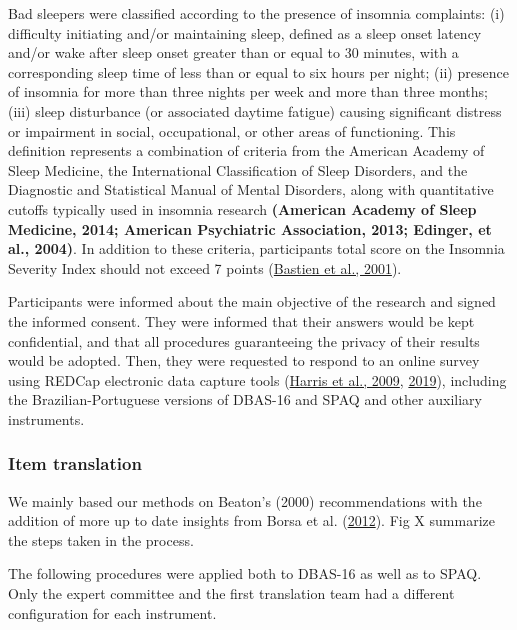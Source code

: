 \documentclass[
  ,doc,11pt, twoside,floatsintext]{apa6}
\begin{document}
Bad sleepers were classified according to the presence of insomnia complaints: (i) difficulty initiating and/or maintaining sleep, defined as a sleep onset latency and/or wake after sleep onset greater than or equal to 30 minutes, with a corresponding sleep time of less than or equal to six hours per night; (ii) presence of insomnia for more than three nights per week and more than three months; (iii) sleep disturbance (or associated daytime fatigue) causing significant distress or impairment in social, occupational, or other areas of functioning. This definition represents a combination of criteria from the American Academy of Sleep Medicine, the International Classification of Sleep Disorders, and the Diagnostic and Statistical Manual of Mental Disorders, along with quantitative cutoffs typically used in insomnia research \textbf{(American Academy of Sleep Medicine, 2014; American Psychiatric Association, 2013; Edinger, et al., 2004)}. In addition to these criteria, participants total score on the Insomnia Severity Index should not exceed 7 points (\protect\hyperlink{ref-bastien2001}{Bastien et al., 2001}).

Participants were informed about the main objective of the research and signed the informed consent. They were informed that their answers would be kept confidential, and that all procedures
guaranteeing the privacy of their results would be adopted. Then, they were requested to respond to an online survey using REDCap electronic data capture tools (\protect\hyperlink{ref-harris2009research}{Harris et al., 2009}, \protect\hyperlink{ref-harris2019redcap}{2019}), including the Brazilian-Portuguese versions of DBAS-16 and SPAQ and other auxiliary instruments.

\hypertarget{item-translation}{%
\subsubsection{Item translation}\label{item-translation}}

We mainly based our methods on Beaton's (2000) recommendations with the addition of more up to date insights from Borsa et al. (\protect\hyperlink{ref-borsaAdaptacaoValidacaoInstrumentos2012}{2012}). Fig X summarize the steps taken in the process.

The following procedures were applied both to DBAS-16 as well as to SPAQ. Only the expert committee and the first translation team had a different configuration for each instrument.
\end{document}
